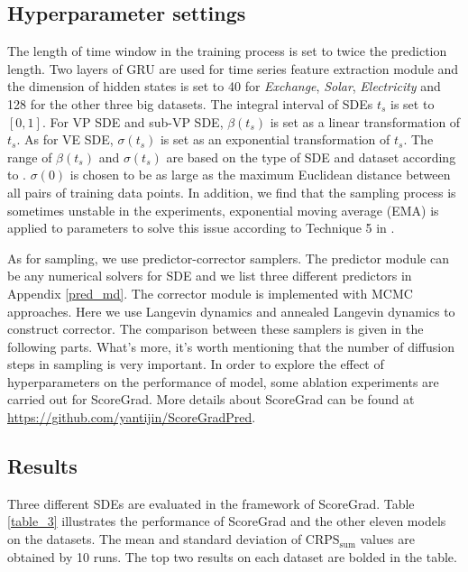 \subsection{Hyperparameter settings}
The length of time window in the training process is set to twice the prediction length. Two layers of GRU are used for time series feature extraction module and the dimension of hidden states is set to 40 for \textit{Exchange}, \textit{Solar}, \textit{Electricity} and 128 for the other three big datasets. The integral interval of SDEs $t_s$ is set to $[0, 1]$. For VP SDE and sub-VP SDE, $\beta(t_s)$ is set as a linear transformation of $t_s$. As for VE SDE, $\sigma(t_s)$ is set as an exponential transformation of $t_s$. The range of $\beta(t_s)$ and $\sigma(t_s)$ are based on the type of SDE and dataset according to \cite{song2020improved}. $\sigma(0)$ is chosen to be as large as the maximum Euclidean distance between all pairs of training data points. In addition, we find that the sampling process is sometimes unstable in the experiments, exponential moving average (EMA) is applied to parameters to solve this issue according to Technique 5 in \cite{song2020improved}. 

As for sampling, we use predictor-corrector samplers. The predictor module can be any numerical solvers for SDE and we list three different predictors in Appendix \ref{pred_md}. The corrector module is implemented with MCMC approaches. Here we use Langevin dynamics and annealed Langevin dynamics to construct corrector. The comparison between these samplers is given in the following parts. What's more, it's worth mentioning that the number of diffusion steps in sampling is very important. In order to explore the effect of hyperparameters on the performance of model, some ablation experiments are carried out for ScoreGrad. More details about ScoreGrad can be found at \url{https://github.com/yantijin/ScoreGradPred}.

\subsection{Results}

Three different SDEs are evaluated in the framework of ScoreGrad. Table \ref{table_3} illustrates the performance of ScoreGrad and the other eleven models on the datasets. The mean and standard deviation of $\text{CRPS}_{\text{sum}}$ values are obtained by 10 runs. The top two results on each dataset are bolded in the table.

